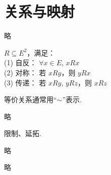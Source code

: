 \section{关系与映射}

\begin{definition}[关系，对应]
    略
\end{definition}

\begin{definition}[等价关系] 
$R \subseteq E^2$，满足：\\
(1) 自反： $\forall x \in E$, $xRx$ \\
(2) 对称： 若 $xRy$，则 $yRx$ \\ 
(3) 传递： 若 $xRy$, $yRz$，则 $xRz$
\end{definition}

等价关系通常用“$\sim$”表示. 

\begin{definition}[映射，函数]
    略
\end{definition}

限制、延拓.

\begin{definition}[逆映射]
    略
\end{definition}

\begin{definition}[复合映射]
    略
\end{definition}